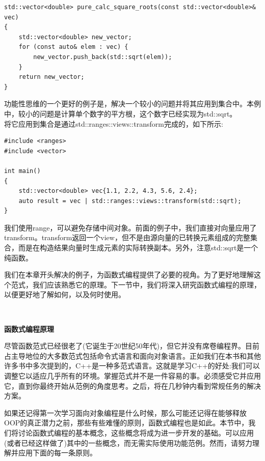 \begin{lstlisting}[caption={}]
std::vector<double> pure_calc_square_roots(const std::vector<double>& vec)
{
	std::vector<double> new_vector;
	for (const auto& elem : vec) {
		new_vector.push_back(std::sqrt(elem));
	}
	return new_vector;
}
\end{lstlisting}

功能性思维的一个更好的例子是，解决一个较小的问题并将其应用到集合中。本例中，较小的问题是计算单个数字的平方根，这个数字已经实现为std::sqrt。\\将它应用到集合是通过std::ranges::views::transform完成的，如下所示: \par

\begin{lstlisting}[caption={}]
#include <ranges>
#include <vector>

int main()
{
	std::vector<double> vec{1.1, 2.2, 4.3, 5.6, 2.4};
	auto result = vec | std::ranges::views::transform(std::sqrt);
}
\end{lstlisting}

我们使用range，可以避免存储中间对象。前面的例子中，我们直接对向量应用了transform。transform返回一个view，但不是由源向量的已转换元素组成的完整集合，而是在构造结果向量时生成元素的实际转换副本。另外，注意std::sqrt是一个纯函数。 \par
我们在本章开头解决的例子，为函数式编程提供了必要的视角。为了更好地理解这个范式，我们应该熟悉它的原理。下一节中，我们将深入研究函数式编程的原理，以便更好地了解如何，以及何时使用。 \par

\noindent\textbf{}\ \par
\textbf{函数式编程原理} \ \par
尽管函数范式已经很老了(它诞生于20世纪50年代)，但它并没有席卷编程界。目前占主导地位的大多数范式包括命令式语言和面向对象语言。正如我们在本书和其他许多书中多次提到的，C++是一种多范式语言。这就是学习C++的好处:我们可以调整它以适应几乎所有的环境。掌握范式并不是一件容易的事。必须感受它并应用它，直到你最终开始从范例的角度思考。之后，将在几秒钟内看到常规任务的解决方案。 \par
如果还记得第一次学习面向对象编程是什么时候，那么可能还记得在能够释放OOP的真正潜力之前，那些有些难懂的原则，函数式编程也是如此。本节中，我们将讨论函数式编程的基本概念，这些概念将成为进一步开发的基础。可以应用(或者已经这样做了)其中的一些概念，而无需实际使用功能范例。然而，请努力理解并应用下面的每一条原则。 \par

